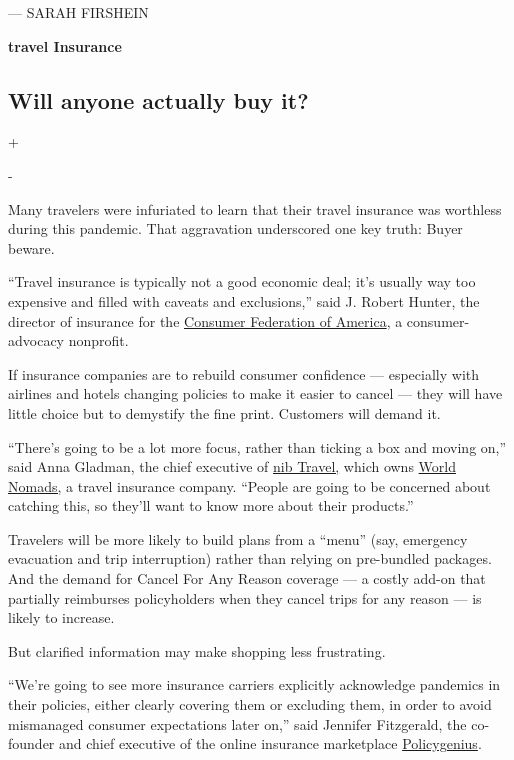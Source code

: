 --- SARAH FIRSHEIN

\textbf{travel Insurance}

\hypertarget{will-anyone-actually-buy-it}{%
\subsection{Will anyone actually buy
it?}\label{will-anyone-actually-buy-it}}

+

-

Many travelers were infuriated to learn that their travel insurance was
worthless during this pandemic. That aggravation underscored one key
truth: Buyer beware.

``Travel insurance is typically not a good economic deal; it's usually
way too expensive and filled with caveats and exclusions,'' said J.
Robert Hunter, the director of insurance for the
\href{https://consumerfed.org/}{Consumer Federation of America}, a
consumer-advocacy nonprofit.

If insurance companies are to rebuild consumer confidence --- especially
with airlines and hotels changing policies to make it easier to cancel
--- they will have little choice but to demystify the fine print.
Customers will demand it.

``There's going to be a lot more focus, rather than ticking a box and
moving on,'' said Anna Gladman, the chief executive of
\href{https://www.nibtravelinsurance.com.au/}{nib Travel,} which owns
\href{https://www.worldnomads.com/usa/}{World Nomads,} a travel
insurance company. ``People are going to be concerned about catching
this, so they'll want to know more about their products.''

Travelers will be more likely to build plans from a ``menu'' (say,
emergency evacuation and trip interruption) rather than relying on
pre-bundled packages. And the demand for Cancel For Any Reason coverage
--- a costly add-on that partially reimburses policyholders when they
cancel trips for any reason --- is likely to increase.

But clarified information may make shopping less frustrating.

``We're going to see more insurance carriers explicitly acknowledge
pandemics in their policies, either clearly covering them or excluding
them, in order to avoid mismanaged consumer expectations later on,''
said Jennifer Fitzgerald, the co-founder and chief executive of the
online insurance marketplace
\href{https://www.policygenius.com/}{Policygenius}.


